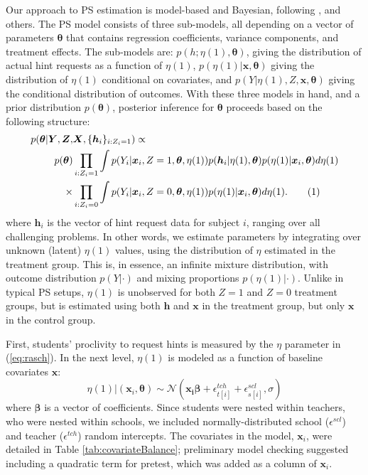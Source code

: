 \documentclass{article}\usepackage[]{graphicx}\usepackage[]{color}
\newcommand\numberthis{\addtocounter{equation}{1}\tag{\theequation}}
\begin{document}
Our approach to PS estimation is model-based and Bayesian, following
\citet{jin2008principal},
\citet{schwartz2011bayesian} and others.
The PS model consists of three sub-models, all depending on a
 vector of parameters $\bm{\theta}$ that contains regression
 coefficients, variance components, and treatment effects.
The sub-models are:
$p(h;\eta(1),\bm{\theta})$, giving the distribution of actual hint
requests as a function of $\eta(1)$, $p(\eta(1)|\bm{x},\bm{\theta})$
giving the distribution of $\eta(1)$ conditional on covariates, and
$p(Y|\eta(1),Z,\bm{x},\bm{\theta})$ giving the conditional
distribution of outcomes.
With these three models in hand, and a prior distribution
$p(\bm{\theta})$, posterior inference for $\bm{\theta}$ proceeds based
on the following structure:
\begin{align*}
p(\bm{\theta}|\bm{Y},\bm{Z},&\bm{X},\{\bm{h}_i\}_{i:Z_i=1})\propto\\
p(\bm{\theta})&\displaystyle\prod_{i: Z_i=1}\int p(Y_i|\bm{x}_i,Z=1,\bm{\theta},\eta(1))p(\bm{h}_{i}|\eta(1),\bm{\theta})p(\eta(1)|\bm{x}_i,\bm{\theta})d\eta(1)\\
\times&\displaystyle\prod_{i:Z_i=0} \int p(Y_i|\bm{x}_i,Z=0,\bm{\theta},\eta(1))p(\eta(1)|\bm{x}_i,\bm{\theta})d\eta(1).\numberthis\label{eq:posteriorEta}
\end{align*}
where $\bm{h}_i$ is the vector of hint request data for subject $i$,
ranging over all challenging problems.
In other words, we estimate parameters by integrating over unknown
(latent) $\eta(1)$ values, using the distribution of $\eta$ estimated
in the treatment group.
This is, in essence, an infinite mixture distribution, with outcome
distribution $p(Y|\cdot)$ and mixing proportions $p(\eta(1)|\cdot)$.
Unlike in typical PS setups, $\eta(1)$ is unobserved for both $Z=1$
and $Z=0$ treatment groups, but is estimated using both $\bm{h}$ and
$\bm{x}$ in the treatment group, but only $\bm{x}$ in the control
group.

First, students' proclivity to request hints is measured by the $\eta$
parameter in (\ref{eq:rasch}).
In the next level, $\eta(1)$ is modeled as a function of baseline
covariates $\bm{x}$:
\begin{equation}\label{eq:rasch2}
\eta(1)|\left(\bm{x}_i,\bm{\theta}\right) \sim
\mathcal{N}\left(\bm{x_i}\bm{\beta}+\epsilon^{tch}_{t[i]}+\epsilon^{scl}_{s[i]},
\sigma\right)
\end{equation}
where $\bm{\beta}$ is a vector of coefficients.
Since students were nested within teachers, who were nested within
schools, we included normally-distributed school ($\epsilon^{scl}$) and
teacher ($\epsilon^{tch}$) random intercepts.
The covariates in the model, $\bm{x}_i$, were detailed in Table
\ref{tab:covariateBalance}; preliminary model checking suggested
including a quadratic term for pretest, which was added as a column of
$\bm{x}_i$.
\end{document}
